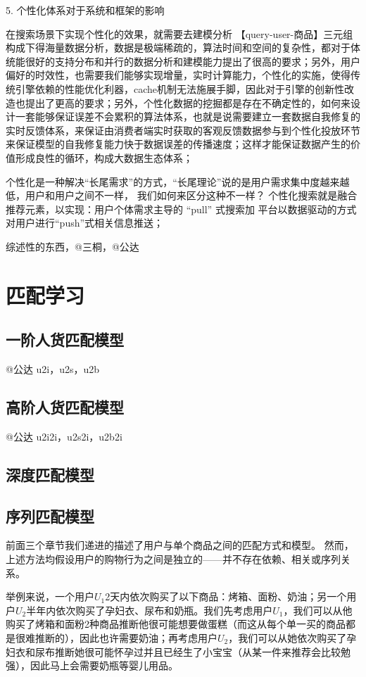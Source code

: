 5. 个性化体系对于系统和框架的影响

在搜索场景下实现个性化的效果，就需要去建模分析 【query-user-商品】三元组构成下得海量数据分析，数据是极端稀疏的，算法时间和空间的复杂性，都对于体统能很好的支持分布和并行的数据分析和建模能力提出了很高的要求；另外，用户偏好的时效性，也需要我们能够实现增量，实时计算能力，个性化的实施，使得传统引擎依赖的性能优化利器，cache机制无法施展手脚，因此对于引擎的创新性改造也提出了更高的要求；另外，个性化数据的挖掘都是存在不确定性的，如何来设计一套能够保证误差不会累积的算法体系，也就是说需要建立一套数据自我修复的实时反馈体系，来保证由消费者端实时获取的客观反馈数据参与到个性化投放环节来保证模型的自我修复能力快于数据误差的传播速度；这样才能保证数据产生的价值形成良性的循环，构成大数据生态体系；



个性化是一种解决“长尾需求”的方式，“长尾理论”说的是用户需求集中度越来越低，用户和用户之间不一样，
我们如何来区分这种不一样？ 个性化搜索就是融合推荐元素，以实现：用户个体需求主导的 “pull” 式搜索加
平台以数据驱动的方式对用户进行“push”式相关信息推送；


综述性的东西，@三桐，@公达

\section{匹配学习}
	
\subsection{一阶人货匹配模型} 
	@公达 u2i，u2s，u2b 

\subsection{高阶人货匹配模型} 
	@公达 u2i2i，u2s2i，u2b2i 

\subsection{深度匹配模型} 

\subsection{序列匹配模型} 

前面三个章节我们递进的描述了用户与单个商品之间的匹配方式和模型。
然而，上述方法均假设用户的购物行为之间是独立的——并不存在依赖、相关或序列关系。

举例来说，一个用户$U_1$2天内依次购买了以下商品：烤箱、面粉、奶油；另一个用户$U_2$半年内依次购买了孕妇衣、尿布和奶瓶。我们先考虑用户$U_1$，我们可以从他购买了烤箱和面粉2种商品推断他很可能想要做蛋糕（而这从每个单一买的商品都是很难推断的），因此也许需要奶油；再考虑用户$U_2$，我们可以从她依次购买了孕妇衣和尿布推断她很可能怀孕过并且已经生了小宝宝（从某一件来推荐会比较勉强），因此马上会需要奶瓶等婴儿用品。


